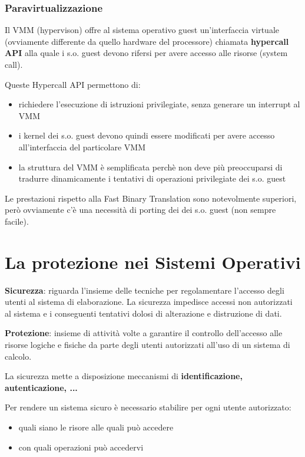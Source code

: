 \documentclass{article}
\begin{document}
\subsubsection{Paravirtualizzazione}
Il VMM (hypervison) offre al sistema operativo guest un'interfaccia virtuale (ovviamente differente da quello hardware del processore) chiamata \textbf{hypercall API}
alla quale i s.o. guest devono rifersi per avere accesso alle risorse (system call).

Queste Hypercall API permettono di:
\begin{itemize}
    \item richiedere l'esecuzione di istruzioni privilegiate, senza generare un interrupt al VMM
    \item i kernel dei s.o. guest devono quindi essere modificati per avere accesso all'interfaccia del particolare VMM
    \item la struttura del VMM è semplificata perchè non deve più preoccuparsi di tradurre dinamicamente i tentativi di operazioni privilegiate dei s.o. guest
\end{itemize}

Le prestazioni rispetto alla Fast Binary Translation sono notevolmente superiori, però ovviamente c'è una necessità di porting dei dei s.o. guest (non sempre facile).

\newpage

\section{La protezione nei Sistemi Operativi}

\textbf{Sicurezza}: riguarda l'insieme delle tecniche per regolamentare l'accesso degli utenti al sistema di elaborazione. La sicurezza impedisce accessi
non autorizzati al sistema e i conseguenti tentativi dolosi di alterazione e distruzione di dati.

\vspace{3mm}
\textbf{Protezione}: insieme di attività volte a garantire il controllo dell'accesso alle risorse logiche e fisiche da parte degli utenti autorizzati
all'uso di un sistema di calcolo.

La sicurezza mette a disposizione meccanismi di \textbf{identificazione, autenticazione, ...}

Per rendere un sistema sicuro è necessario stabilire per ogni utente autorizzato:
\begin{itemize}
    \item quali siano le risore alle quali può accedere
    \item con quali operazioni può accedervi
\end{itemize}
\end{document}
